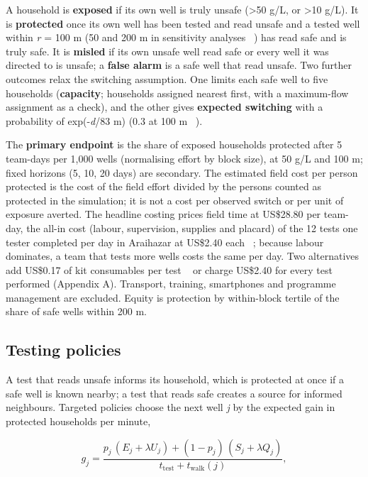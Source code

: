 \documentclass[sustainability,article,submit,pdftex,moreauthors]{Definitions/mdpi}
\begin{document}
A household is \textbf{exposed} if its own well is truly unsafe (>50 \textmu{}g/L, or >10 \textmu{}g/L). It is \textbf{protected} once its own well has been tested and read unsafe and a tested well within \textit{r} = 100 m (50 and 200 m in sensitivity analyses ~\cite{Opar2007,Jameel2021}) has read safe and is truly safe. It is \textbf{misled} if its own unsafe well read safe or every well it was directed to is unsafe; a \textbf{false alarm} is a safe well that read unsafe. Two further outcomes relax the switching assumption. One limits each safe well to five households (\textbf{capacity}; households assigned nearest first, with a maximum-flow assignment as a check), and the other gives \textbf{expected switching} with a probability of exp(-\textit{d}/83 m) (0.3 at 100 m ~\cite{Jameel2021}).

The \textbf{primary endpoint} is the share of exposed households protected after 5 team-days per 1,000 wells (normalising effort by block size), at 50 \textmu{}g/L and 100 m; fixed horizons (5, 10, 20 days) are secondary. The estimated field cost per person protected is the cost of the field effort divided by the persons counted as protected in the simulation; it is not a cost per observed switch or per unit of exposure averted. The headline costing prices field time at US\$28.80 per team-day, the all-in cost (labour, supervision, supplies and placard) of the 12 tests one tester completed per day in Araihazar at US\$2.40 each ~\cite{vanGeen2014,Jamil2019}; because labour dominates, a team that tests more wells costs the same per day. Two alternatives add US\$0.17 of kit consumables per test ~\cite{George2012} or charge US\$2.40 for every test performed (Appendix A). Transport, training, smartphones and programme management are excluded. Equity is protection by within-block tertile of the share of safe wells within 200 m.

\subsection{Testing policies}

A test that reads unsafe informs its household, which is protected at once if a safe well is known nearby; a test that reads safe creates a source for informed neighbours. Targeted policies choose the next well \textit{j} by the expected gain in protected households per minute,


\begin{equation}
g_j = \frac{p_j\,(E_j + \lambda U_j) + (1-p_j)\,(S_j + \lambda Q_j)}{t_\mathrm{test} + t_\mathrm{walk}(j)},
\end{equation}
\end{document}
